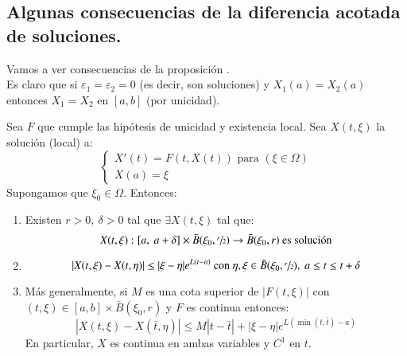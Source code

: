 \subsection{Algunas consecuencias de la diferencia acotada de soluciones.}

Vamos a ver consecuencias de la proposición \label{pro:dif-sol-cot}.\\
 Es claro que si $\varepsilon_1 = \varepsilon_2 = 0$ (es decir, son soluciones) y $X_1(a) = X_2(a)$ entonces $X_1 = X_2$ en $[a, b]$ (por unicidad).
\begin{pro}
    Sea $F$ que cumple las hipótesis de unicidad y existencia local. Sea $X(t, \xi)$ la solución (local) a:
    $$
        \begin{cases}
            X'(t) = F(t, X(t)) \text{ para } (\xi \in \Omega)\\
            X(a) = \xi
        \end{cases}
    $$
    Supongamos que $\xi_0 \in \Omega$. Entonces:
    \begin{enumerate}
        \item Existen $r>0,\ \delta > 0$ tal que $\exists X(t, \xi)$ tal que:
            $$
                X(t, \xi) : [a,\ a+\delta ] \times \bar{B}(\xi_0, \sfrac{r}{2}) \to \bar{B}(\xi_0, r) \text{ es solución}
            $$
        \item
        $$
            |X(t, \xi) - X(t, \eta)| \leq |\xi - \eta| e^{L(t-a)} \text{ con } \eta,\xi \in \bar{B}(\xi_0, \sfrac{r}{2}),\ a\leq t\leq t+\delta
        $$
        \item Más generalmente, si $M$ es una cota superior de $|F(t, \xi)|$ con $(t,\xi) \in [a,b]\times\bar{B}(\xi_0, r)$ y $F$ es continua entonces:
        $$
            |X(t, \xi) - X(\bar{t}, \eta)| \leq M |t - \bar{t}| + |\xi - \eta| e^{L(\min(t,\bar{t})-a)}
        $$
        En particular, $X$ es continua en ambas variables y $C^1$ en $t$.
    \end{enumerate}
\end{pro}
